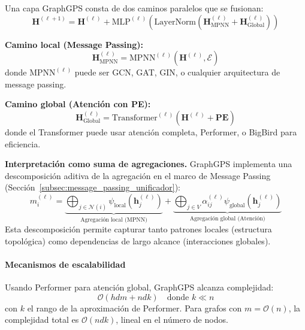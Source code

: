 \begin{definition}\label{def:graphgps_layer}
Una capa GraphGPS consta de dos caminos paralelos que se fusionan:
\begin{equation}
    \mathbf{H}^{(\ell+1)} = \mathbf{H}^{(\ell)} + \text{MLP}^{(\ell)}\left(\text{LayerNorm}\left(\mathbf{H}_{\text{MPNN}}^{(\ell)} + \mathbf{H}_{\text{Global}}^{(\ell)}\right)\right)
    \label{eq:graphgps_main_layer}
\end{equation}

\textbf{Camino local (Message Passing):}
\begin{equation}
    \mathbf{H}_{\text{MPNN}}^{(\ell)} = \text{MPNN}^{(\ell)}\left(\mathbf{H}^{(\ell)}, \mathcal{E}\right)
    \label{eq:graphgps_mpnn_path}
\end{equation}
donde $\text{MPNN}^{(\ell)}$ puede ser \gls{GCN}, \gls{GAT}, GIN, o cualquier arquitectura de message passing.

\textbf{Camino global (Atención con PE):}
\begin{equation}
    \mathbf{H}_{\text{Global}}^{(\ell)} = \text{Transformer}^{(\ell)}\left(\mathbf{H}^{(\ell)} + \mathbf{PE}\right)
    \label{eq:graphgps_global_path}
\end{equation}
donde el \gls{Transformer} puede usar atención completa, Performer, o BigBird para eficiencia.
\end{definition}

\textbf{Interpretación como suma de agregaciones.}\label{rem:graphgps_interpretation} GraphGPS implementa una descomposición aditiva de la agregación en el marco de Message Passing (Sección~\ref{subsec:message_passing_unificador}):
\begin{equation}
    m_i^{(\ell)} = \underbrace{\bigoplus_{j \in \mathcal{N}(i)} \psi_{\text{local}}(\mathbf{h}_j^{(\ell)})}_{\text{Agregación local (MPNN)}} + \underbrace{\bigoplus_{j \in V} \alpha_{ij}^{(\ell)} \psi_{\text{global}}(\mathbf{h}_j^{(\ell)})}_{\text{Agregación global (Atención)}}
    \label{eq:graphgps_message_decomposition}
\end{equation}
Esta descomposición permite capturar tanto patrones locales (estructura topológica) como dependencias de largo alcance (interacciones globales).

\paragraph{Mecanismos de escalabilidad}

\begin{proposition}\label{prop:graphgps_efficient_complexity}
Usando Performer para atención global, GraphGPS alcanza complejidad:
\begin{equation}
    \mathcal{O}(hdm + ndk) \quad \text{donde } k \ll n
    \label{eq:graphgps_linear_complexity}
\end{equation}
con $k$ el rango de la aproximación de Performer. Para grafos con $m = \mathcal{O}(n)$, la complejidad total es $\mathcal{O}(ndk)$, lineal en el número de nodos.
\end{proposition}

